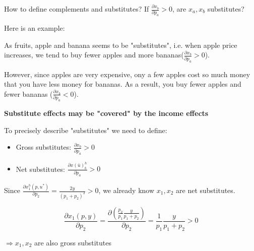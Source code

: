 \documentclass{article}
\begin{document}
\begin{mdframed}[backgroundcolor=blue!20,linecolor=white]

How to define complements and substitutes? If $\frac{\partial x_b}{\partial p_a} > 0$, are $x_a,x_b$ substitutes?

Here is an example:

As fruits, apple and banana seems to be "substitutes", i.e. when apple 
price increases, we tend to buy fewer apples and more bananas($\frac{\partial x_b}{\partial p_a} > 0$).

However, since apples are very expensive, ony a few apples cost so much money that you have less money for bananas. As a result, you buy fewer apples and fewer bananas ($\frac{\partial x_b}{\partial p_a} < 0$).

\textbf{Substitute effects may be "covered" by the income effects}

To precisely describe "substitutes" we need to define:

\begin{itemize}
\item Gross substitutes: $\frac{\partial x_b}{\partial p_a} > 0$
\item Net substitutes: $\frac{\partial x(\bar{u})^h_b}{\partial p_a} > 0$
\end{itemize}

\end{mdframed}

Since $\frac{\partial x_1^h(p,u^*)}{\partial p_2} = \frac{2y}{(p_1 + p_2)^2}>0$, we already know $x_1, x_2$ are net substitutes.

$$\frac{\partial x_1(p,y)}{\partial p_2} = \frac{\partial (\frac{p_2}{p_1}\frac{y}{p_1 + p_2})}{\partial p_2} = \frac{1}{p_1}\frac{y}{p_1 + p_2} > 0$$

$\Rightarrow x_1, x_2$ are also gross substitutes
\end{document}

